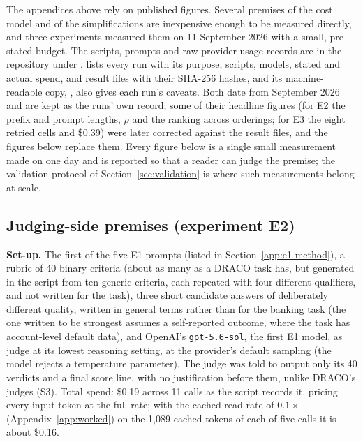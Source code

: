 \documentclass[11pt]{article}
\begin{document}
The appendices above rely on published figures. Several premises of the cost model and of the simplifications are inexpensive enough to be measured directly, and three experiments measured them on 11 September 2026 with a small,
pre-stated budget. The scripts, prompts and raw provider usage records are in the
repository under .  lists every run with its purpose, scripts, models, stated and actual spend, and result files with their SHA-256 hashes, and its machine-readable copy, , also gives each run's caveats. Both date from September 2026 and are kept as the runs' own record; some of their headline figures (for E2 the prefix and prompt lengths, $\rho$ and the ranking across orderings; for E3 the eight retried cells and \$0.39) were later corrected against the result files, and the figures below replace them. Every figure below is a single small measurement made on one day and is reported so that a reader can judge the premise; the validation
protocol of Section~\ref{sec:validation} is where such measurements belong at scale.

\subsection{Judging-side premises (experiment E2)}
\label{app:e2}

\textbf{Set-up.} The first of the five E1 prompts (listed in Section~\ref{app:e1-method}), a
rubric of 40 binary criteria (about as many as a DRACO task has, but generated in the script from ten generic criteria, each repeated with four different qualifiers, and not written for the task), three short candidate answers of
deliberately different quality, written in general terms rather than for the banking task (the one written to be strongest assumes a self-reported outcome, where the task has account-level default data), and OpenAI's \texttt{gpt-5.6-sol}, the first E1 model, as judge at its lowest reasoning
setting, at the provider's default sampling (the model rejects a temperature parameter). The judge was told to output only its 40 verdicts and a final score line, with no justification before them, unlike DRACO's judges (S3).
Total spend: \$0.19 across 11 calls as the script records it, pricing every input token at the full rate; with the cached-read rate of $0.1\times$ (Appendix~\ref{app:worked}) on the 1{,}089 cached tokens of each of five calls it is about \$0.16.
\end{document}
